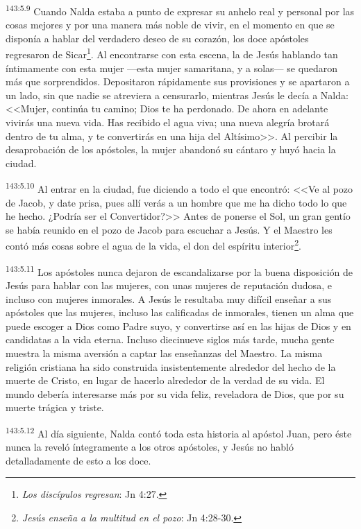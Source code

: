 \par 
\textsuperscript{143:5.9} Cuando Nalda estaba a punto de expresar su anhelo real y personal por las cosas mejores y por una manera más noble de vivir, en el momento en que se disponía a hablar del verdadero deseo de su corazón, los doce apóstoles regresaron de Sicar\footnote{\textit{Los discípulos regresan}: Jn 4:27.}. Al encontrarse con esta escena, la de Jesús hablando tan íntimamente con esta mujer ---esta mujer samaritana, y a solas--- se quedaron más que sorprendidos. Depositaron rápidamente sus provisiones y se apartaron a un lado, sin que nadie se atreviera a censurarlo, mientras Jesús le decía a Nalda: <<Mujer, continúa tu camino; Dios te ha perdonado. De ahora en adelante vivirás una nueva vida. Has recibido el agua viva; una nueva alegría brotará dentro de tu alma, y te convertirás en una hija del Altísimo>>. Al percibir la desaprobación de los apóstoles, la mujer abandonó su cántaro y huyó hacia la ciudad.

\par 
\textsuperscript{143:5.10} Al entrar en la ciudad, fue diciendo a todo el que encontró: <<Ve al pozo de Jacob, y date prisa, pues allí verás a un hombre que me ha dicho todo lo que he hecho. ¿Podría ser el Convertidor?>> Antes de ponerse el Sol, un gran gentío se había reunido en el pozo de Jacob para escuchar a Jesús. Y el Maestro les contó más cosas sobre el agua de la vida, el don del espíritu interior\footnote{\textit{Jesús enseña a la multitud en el pozo}: Jn 4:28-30.}.

\par 
\textsuperscript{143:5.11} Los apóstoles nunca dejaron de escandalizarse por la buena disposición de Jesús para hablar con las mujeres, con unas mujeres de reputación dudosa, e incluso con mujeres inmorales. A Jesús le resultaba muy difícil enseñar a sus apóstoles que las mujeres, incluso las calificadas de inmorales, tienen un alma que puede escoger a Dios como Padre suyo, y convertirse así en las hijas de Dios y en candidatas a la vida eterna. Incluso diecinueve siglos más tarde, mucha gente muestra la misma aversión a captar las enseñanzas del Maestro. La misma religión cristiana ha sido construida insistentemente alrededor del hecho de la muerte de Cristo, en lugar de hacerlo alrededor de la verdad de su vida. El mundo debería interesarse más por su vida feliz, reveladora de Dios, que por su muerte trágica y triste.

\par 
\textsuperscript{143:5.12} Al día siguiente, Nalda contó toda esta historia al apóstol Juan, pero éste nunca la reveló íntegramente a los otros apóstoles, y Jesús no habló detalladamente de esto a los doce.

